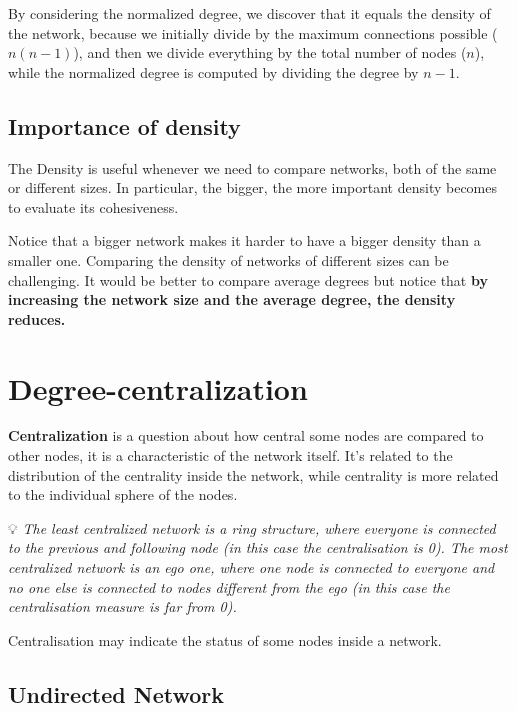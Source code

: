 \documentclass[
  notitlepage,
  onecolumn,
  openany]{book}
\begin{document}
By considering the normalized degree, we discover that it equals the density of the network, because we initially divide by the maximum connections possible (\(n(n-1)\)), and then we divide everything by the total number of nodes (\(n\)), while the normalized degree is computed by dividing the degree by \(n-1\).

\hypertarget{importance-of-density}{%
\subsection{Importance of density}\label{importance-of-density}}

The Density is useful whenever we need to compare networks, both of the same or different sizes. In particular, the bigger, the more important density becomes to evaluate its cohesiveness.

Notice that a bigger network makes it harder to have a bigger density than a smaller one. Comparing the density of networks of different sizes can be challenging. It would be better to compare average degrees but notice that \textbf{by increasing the network size and the average degree, the density reduces.}

\hypertarget{degree-centralization}{%
\section{Degree-centralization}\label{degree-centralization}}

\textbf{Centralization} is a question about how central some nodes are compared to other nodes, it is a characteristic of the network itself. It's related to the distribution of the centrality inside the network, while centrality is more related to the individual sphere of the nodes.

💡 \emph{The least centralized network is a ring structure, where everyone is connected to the previous and following node (in this case the centralisation is 0).
The most centralized network is an ego one, where one node is connected to everyone and no one else is connected to nodes different from the ego (in this case the centralisation measure is far from 0).}

Centralisation may indicate the status of some nodes inside a network.

\hypertarget{undirected-network-2}{%
\subsection{Undirected Network}\label{undirected-network-2}}
\end{document}
